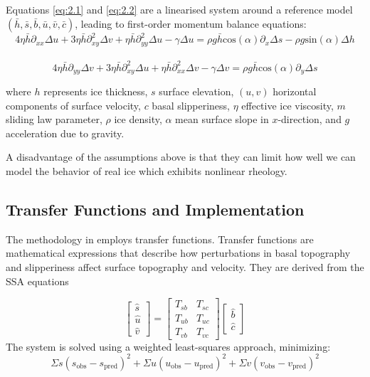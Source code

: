 Equations \ref{eq:2.1} and \ref{eq:2.2} are a linearised system around a reference model $(\bar{h}, \bar{s}, \bar{b}, \bar{u}, \bar{v}, \bar{c})$, leading to first-order momentum balance equations:
\begin{equation}
4 \eta \bar{h} \partial_{xx} \Delta u + 3 \eta \bar{h} \partial_{xy}^{2} \Delta v + \eta \bar{h} \partial_{yy}^{2}\Delta u -\gamma \Delta u  = \rho g \bar{h}\mathrm{cos}(\alpha) \partial_x \Delta s - \rho g \mathrm{sin}(\alpha)\Delta h
\end{equation}\\
\begin{equation}
4 \eta \bar{h} \partial_{yy} \Delta v + 3 \eta \bar{h} \partial_{xy}^{2} \Delta u + \eta \bar{h} \partial_{xx}^{2}\Delta v -\gamma \Delta v  = \rho g \bar{h}\mathrm{cos}(\alpha) \partial_y \Delta s
\end{equation}

where $h$ represents ice thickness, $s$ surface elevation, $(u, v)$ horizontal components of surface velocity, $c$ basal slipperiness, $\eta$ effective ice viscosity, $m$ sliding law parameter, $\rho$ ice density, $\alpha$ mean surface slope in $x$-direction, and $g$ acceleration due to gravity.

A disadvantage of the  assumptions above is that they can limit how well we can model the behavior of real ice which exhibits nonlinear rheology.

\subsection*{Transfer Functions and Implementation}

The methodology in \cite{Ockenden_2022} employs transfer functions. Transfer functions are mathematical expressions that describe how perturbations in basal topography and slipperiness affect surface topography and velocity. They are derived from the SSA equations

$$\begin{bmatrix}
\hat{s} \\
\hat{u} \\
\hat{v}
\end{bmatrix} =\begin{bmatrix}
T_{sb} & T_{sc} \\
T_{ub} & T_{uc} \\
T_{vb} & T_{vc}
\end{bmatrix}
\begin{bmatrix}
\hat{b}\\
\hat{c}
\end{bmatrix}$$
The system is solved using a weighted least-squares approach, minimizing:
\begin{equation}
\Sigma s(s_{\mathrm{obs}} - s_{\mathrm{pred}})^2 + \Sigma u(u_{\mathrm{obs}} - u_{\mathrm{pred}})^2 + \Sigma v(v_{\mathrm{obs}} - v_{\mathrm{pred}})^2
\end{equation}

